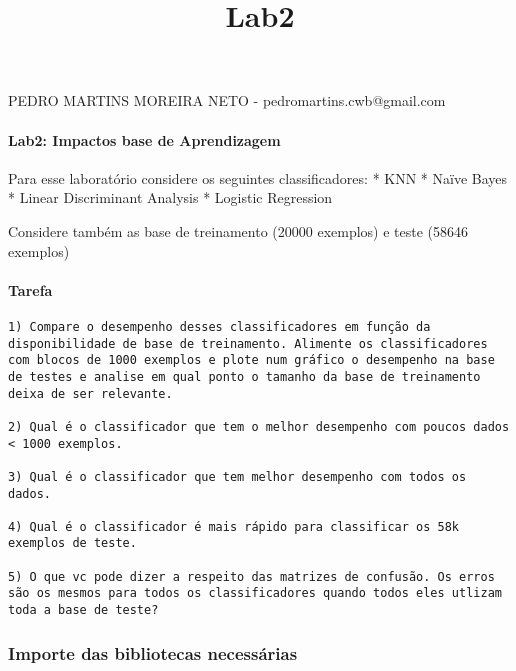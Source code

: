 \documentclass[11pt]{article}
\title{Lab2}
\begin{document}
    
    
    \maketitle
    
    

    
    PEDRO MARTINS MOREIRA NETO - pedromartins.cwb@gmail.com

    \hypertarget{lab2-impactos-base-de-aprendizagem}{%
\paragraph{Lab2: Impactos base de
Aprendizagem}\label{lab2-impactos-base-de-aprendizagem}}

Para esse laboratório considere os seguintes classificadores: * KNN *
Naïve Bayes * Linear Discriminant Analysis * Logistic Regression

Considere também as base de treinamento (20000 exemplos) e teste (58646
exemplos)

\hypertarget{tarefa}{%
\paragraph{Tarefa}\label{tarefa}}

\begin{verbatim}
1) Compare o desempenho desses classificadores em função da disponibilidade de base de treinamento. Alimente os classificadores com blocos de 1000 exemplos e plote num gráfico o desempenho na base de testes e analise em qual ponto o tamanho da base de treinamento deixa de ser relevante.

2) Qual é o classificador que tem o melhor desempenho com poucos dados < 1000 exemplos.

3) Qual é o classificador que tem melhor desempenho com todos os dados.

4) Qual é o classificador é mais rápido para classificar os 58k exemplos de teste.

5) O que vc pode dizer a respeito das matrizes de confusão. Os erros são os mesmos para todos os classificadores quando todos eles utlizam toda a base de teste?
\end{verbatim}

    \hypertarget{importe-das-bibliotecas-necessuxe1rias}{%
\subsubsection{Importe das bibliotecas
necessárias}\label{importe-das-bibliotecas-necessuxe1rias}}
\end{document}
